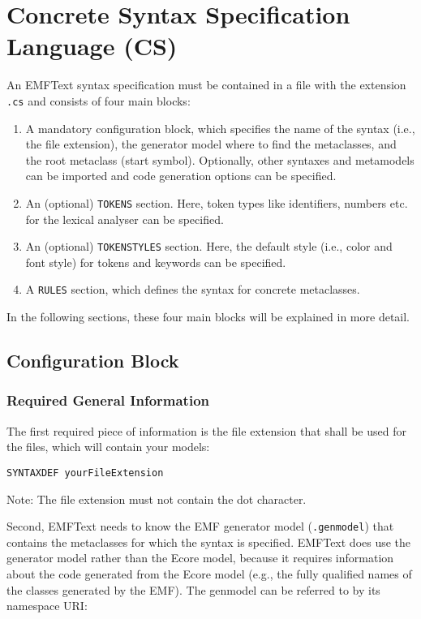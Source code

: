 \chapter{Concrete Syntax Specification Language (CS)}
\label{chap:cs}

An EMFText syntax specification must be contained in a file with the 
extension \texttt{.cs} and consists of four main blocks:

\begin{enumerate}
  \item A mandatory configuration block, which specifies the name of the syntax
        (i.e., the file extension), the generator model where to find the
        metaclasses, and the root metaclass (start symbol). Optionally, other
        syntaxes and metamodels can be imported and code generation options can
        be specified.
  \item An (optional) \texttt{TOKENS} section. Here, token types like identifiers, numbers etc.
  		 for the lexical analyser can be specified.
  \item An (optional) \texttt{TOKENSTYLES} section. Here, the default style
        (i.e., color and font style) for tokens and keywords can be specified.
  \item A \texttt{RULES} section, which defines the syntax for concrete
        metaclasses.
\end{enumerate}

In the following sections, these four main blocks will be explained in more
detail.

\section{Configuration Block}

\subsection{Required General Information}

The first required piece of information is the file extension that shall
be used for the files, which will contain your models:

\begin{lstlisting}
SYNTAXDEF yourFileExtension
\end{lstlisting}

Note: The file extension must not contain the dot character.

Second, EMFText needs to know the EMF generator model (\texttt{.genmodel}) that
contains the metaclasses for which the syntax is specified. EMFText does use
the generator model rather than the Ecore model, because it requires
information about the code generated from the Ecore model (e.g., the fully
qualified names of the classes generated by the EMF). The genmodel can be referred 
to by its namespace URI: 

